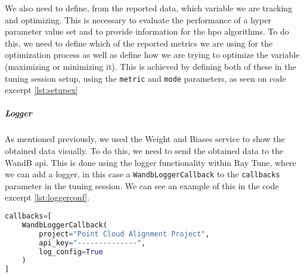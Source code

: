 We also need to define, from the reported data, which variable we are tracking and optimizing. This is necessary to evaluate the performance of a hyper parameter value set and to provide information for the \acrshort{hpo} algorithms. To do this, we need to define which of the reported metrics we are using for the optimization process as well as define how we are trying to optimize the variable (maximizing or minimizing it). This is achieved by defining both of these in the tuning session setup, using the \verb!metric! and \verb!mode! parameters, as seen on code excerpt \ref{lst:setupex}

\subparagraph{Logger}

As mentioned previously, we used the Weight and Biases service to show the obtained data visually. To do this, we need to send the obtained data to the WandB \acrshort{api}. This is done using the logger functionality within Ray Tune, where we can add a logger, in this case a \verb!WandbLoggerCallback! to the \verb!callbacks! parameter in the tuning session. We can see an example of this in the code excerpt \ref{lst:loggerconf}.

\begin{lstlisting}[language=Python, caption=Example WandB logger configuration, captionpos=b, label={lst:loggerconf}]
callbacks=[
    WandbLoggerCallback(
        project="Point Cloud Alignment Project",
        api_key="--------------",
        log_config=True
    )
]
\end{lstlisting}
